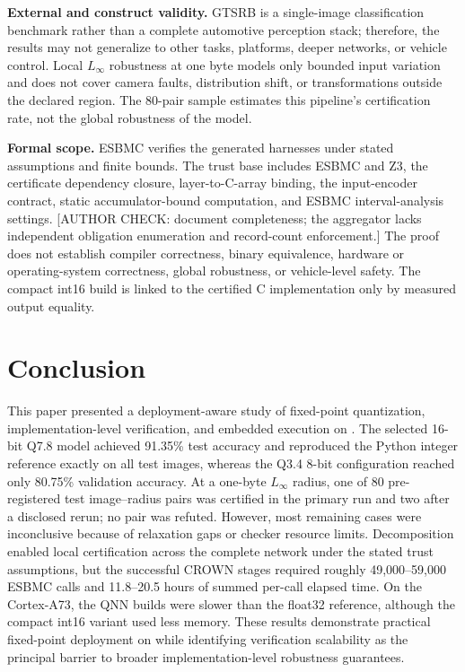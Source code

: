 \textbf{External and construct validity.} GTSRB is a single-image classification benchmark rather than a complete automotive perception stack; therefore, the results may not generalize to other tasks, platforms, deeper networks, or vehicle control. Local $L_\infty$ robustness at one byte models only bounded input variation and does not cover camera faults, distribution shift, or transformations outside the declared region. The 80-pair sample estimates this pipeline's certification rate, not the global robustness of the model.

\textbf{Formal scope.} ESBMC verifies the generated harnesses under stated assumptions and finite bounds. The trust base includes ESBMC and Z3, the certificate dependency closure, layer-to-C-array binding, the input-encoder contract, static accumulator-bound computation, and ESBMC interval-analysis settings. [AUTHOR CHECK: document completeness; the aggregator lacks independent obligation enumeration and record-count enforcement.] The proof does not establish compiler correctness, binary equivalence, hardware or operating-system correctness, global robustness, or vehicle-level safety. The compact int16 build is linked to the certified C implementation only by measured output equality.



\section{Conclusion}
\label{sec:conclusion}

This paper presented a deployment-aware study of fixed-point quantization, implementation-level verification, and embedded execution on \AAOS{}. The selected 16-bit Q7.8 model achieved 91.35\% test accuracy and reproduced the Python integer reference exactly on all test images, whereas the Q3.4 8-bit configuration reached only 80.75\% validation accuracy. At a one-byte $L_\infty$ radius, one of 80 pre-registered test image--radius pairs was certified in the primary run and two after a disclosed rerun; no pair was refuted. However, most remaining cases were inconclusive because of relaxation gaps or checker resource limits. Decomposition enabled local certification across the complete network under the stated trust assumptions, but the successful CROWN stages required roughly 49,000--59,000 ESBMC calls and 11.8--20.5 hours of summed per-call elapsed time. On the Cortex-A73, the QNN builds were slower than the float32 reference, although the compact int16 variant used less memory. These results demonstrate practical fixed-point deployment on \AAOS{} while identifying verification scalability as the principal barrier to broader implementation-level robustness guarantees.
